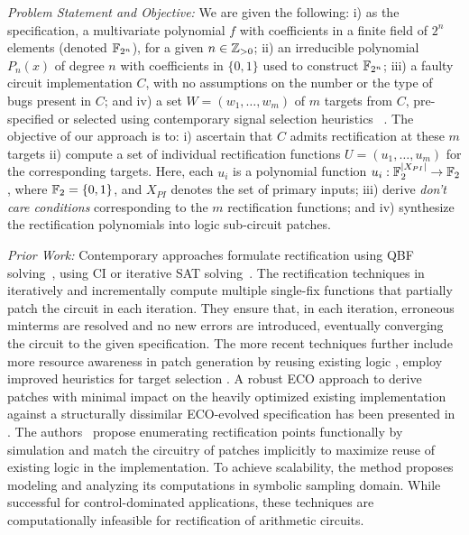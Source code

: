
{\it Problem Statement and Objective:}
We are given the following: i) as the specification, a multivariate
polynomial $f$ with coefficients in a finite field of $2^n$ elements
(denoted ${\mathbb{F}}_{2^n}$), for a given  $n\in {\mathbb{Z}}_{> 0}$; ii) an irreducible
polynomial $P_n(x)$ of degree $n$ with coefficients in $\{0,1\}$ used 
to construct ${\mathbb{F}}_{2^n}$; iii) a faulty circuit implementation $C$,
with no assumptions on the number or the type of bugs present in
$C$; and iv) a set $W = (w_1,\dots,w_m)$ of $m$ targets from $C$,
pre-specified or selected using contemporary signal selection heuristics 
~\cite{SS_Alan:DAC18,SS_Fujita:ISCAS19,SS_Roland:DAC19}.
The objective of our approach is to: 
{\red i) ascertain that $C$ 
admits rectification at these $m$ targets}
ii) compute a set
of individual rectification functions $U =
(u_1,\dots,u_m)$ for the corresponding targets. Here, each $u_i$ is a 
polynomial function $u_i:{\mathbb{F}}_2^{|X_{PI}|}\rightarrow{\mathbb{F}}_2$, where ${\mathbb{F}}_2=\{0,1\}$, 
and $X_{PI}$ denotes the
set of primary inputs; iii) derive {\it don't care conditions}
corresponding to the $m$ rectification functions; and iv) synthesize
the rectification polynomials into logic sub-circuit patches.


{\it Prior Work:} Contemporary approaches formulate rectification
using QBF solving~\cite{scholl:2}, using CI or iterative SAT
solving~\cite{MF_Huang:DATE12}.  
The rectification techniques in 
\cite{SS_Fujita:ISCAS19,MF_Huang:DATE12,SS_Roland:DAC18} 
iteratively and incrementally compute multiple single-fix functions
that partially patch the circuit in each iteration.
{\red They ensure that, in each iteration, erroneous minterms are resolved
and no new errors are introduced, eventually converging the circuit
to the given specification.}
The more recent techniques further
include more resource awareness in patch generation by reusing
existing logic \cite{SS_Alan:DAC18}, employ improved heuristics for
target selection \cite{SS_Fujita:ISCAS19}.
{\red A robust ECO approach to derive patches with minimal 
impact on the heavily optimized existing implementation against 
a structurally dissimilar ECO-evolved specification has been presented in
\cite{SS_Roland:DAC19}. 
The authors~\cite{SS_Roland:DAC19} propose enumerating rectification points 
functionally by simulation and match the circuitry of patches implicitly to maximize reuse of 
existing logic in the implementation. To achieve scalability, the method proposes 
modeling and analyzing its computations in symbolic sampling domain. }
While successful for control-dominated applications, these techniques are
computationally infeasible for rectification of arithmetic circuits.

